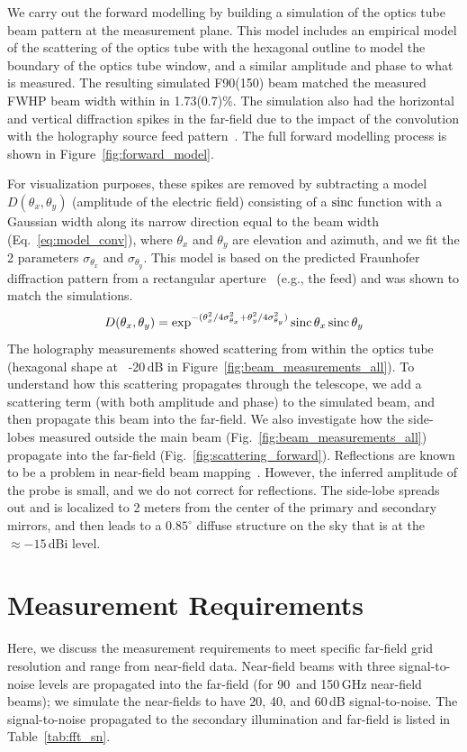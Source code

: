 We carry out the forward modelling by building a simulation of the optics tube beam pattern at the measurement plane.  This model includes an empirical model of the scattering of the optics tube with the hexagonal outline to model the boundary of the optics tube window, and a similar amplitude and phase to what is measured.  The resulting simulated F90(150) beam matched the measured FWHP beam width within in 1.73(0.7)\%.  The simulation also had the horizontal and vertical diffraction spikes in the far-field due to the impact of the convolution with the holography source feed pattern~\cite{Goodman2005-ne}.  The full forward modelling process is shown in Figure~\ref{fig:forward_model}.

For visualization purposes, these spikes are removed by subtracting a model $D(\theta_x,\theta_y)$ (amplitude of the electric field) consisting of a $\operatorname{sinc}$ function with a Gaussian width along its narrow direction equal to the beam width (Eq.~\ref{eq:model_conv}), where $\theta_x$ and $\theta_y$ are elevation and azimuth, and we fit the 2 parameters $\sigma_{\theta_x}$ and $\sigma_{\theta_y}$.  This model is based on the predicted Fraunhofer diffraction pattern from a rectangular aperture~\cite{Goodman2005-ne} (e.g., the feed) and was shown to match the simulations.
\begin{equation}
    D(\theta_x,\theta_y) = \exp^{-(\theta_x^2/4\sigma_{\theta_x}^2 +\theta_y^2/4\sigma_{\theta_y}^2 )}\operatorname{sinc}{\theta_x}\operatorname{sinc}{\theta_y}
    \label{eq:model_conv}
\end{equation}
The holography measurements showed scattering from within the optics tube (hexagonal shape at ~-20\,dB in Figure~\ref{fig:beam_measurements_all}).  To understand how this scattering propagates through the telescope, we add a scattering term (with both amplitude and phase) to the simulated beam, and then propagate this beam into the far-field.  We also investigate how the side-lobes measured outside the main beam (Fig.~\ref{fig:beam_measurements_all}) propagate into the far-field (Fig.~\ref{fig:scattering_forward}).  Reflections are known to be a problem in near-field beam mapping~\cite{2020JLTP..199..156Y,7740846,387181}.  However, the inferred amplitude of the probe is small, and we do not correct for reflections.  The side-lobe spreads out and is localized to 2 meters from the center of the primary and secondary mirrors, and then leads to a $0.85^{\circ}$ diffuse structure on the sky that is at the $\approx -15$\,dBi level.

\section{Measurement Requirements}
\label{sec:err_prop}
Here, we discuss the measurement requirements to meet specific far-field grid resolution and range from near-field data.  Near-field beams with three signal-to-noise levels are propagated into the far-field (for 90\, and 150\,GHz near-field beams); we simulate the near-fields to have 20, 40, and 60\,dB signal-to-noise.  The signal-to-noise propagated to the secondary illumination and far-field is listed in Table~\ref{tab:fft_sn}. 

